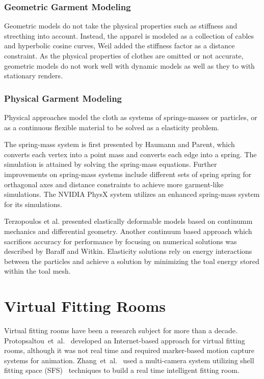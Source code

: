 \subsubsection{Geometric Garment Modeling}
Geometric models 
do not take the physical properties such as stiffness and strecthing into account. Instead, the apparel is modeled as a collection of cables and hyperbolic cosine curves, Weil added the stiffness
factor as a distance constraint\cite{Weil1986}. As the physical properties of clothes are omitted or not accurate, geometric models do not work well with dynamic models as well as they to with 
stationary renders\cite{Weil1986}.

\subsubsection{Physical Garment Modeling}
Physical approaches model the cloth as systems of springs-masses or particles, or as a continuous flexible material to be solved as a elasticity problem.

The spring-mass system is first presented by Haumann and Parent\cite{Haumann1988}, which converts 
each vertex into a point mass and converts each edge into a spring. The simulation is attained by solving the spring-mass equations. Further improvements on spring-mass systems include
different sets of spring spring for orthagonal axes and distance constraints to achieve more garment-like simulations\cite{Provot1996}. The NVIDIA PhysX system utilizes an enhanced 
spring-mass system for its simulations\cite{Kim2011}.

Terzopoulos et al.\cite{Terzopoulos1987} presented elastically deformable models based on continumm mechanics and differential geometry. Another continuum based approach which 
sacrifices accuracy for performance by focusing on numerical solutions was described by Baraff and Witkin\cite{Baraff1998}. Elasticity solutions rely on energy interactions between 
the particles and achieve a solution by minimizing the toal energy stored within the toal mesh.

\section{Virtual Fitting Rooms}
\label{section_related_virtual_fitting}

Virtual fitting rooms have been a research subject for more than a decade. Protopsaltou~et~al.~\cite{Protopsaltou2002} developed an Inter\-net-based approach 
for virtual fitting rooms, although it was not real time and required marker-based motion capture systems for animation. Zhang~et~al.~\cite{Zhang2008} used a 
multi-camera system utilizing shell fitting space (SFS)~\cite{Cheung2005} techniques to build a real time intelligent fitting room.

